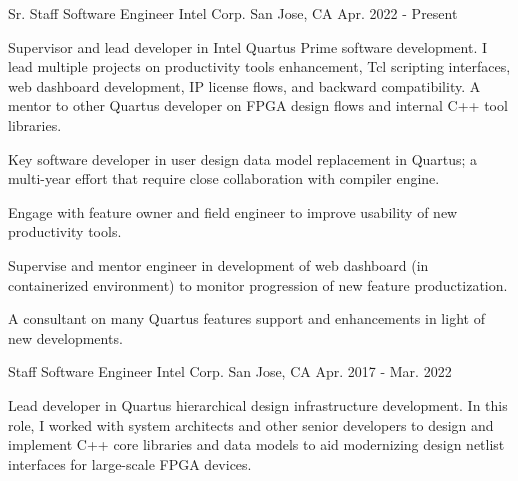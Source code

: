 \documentclass[12pt, letterpaper]{awesome-cv}
\begin{document}

\begin{cventries}
	\cventry
		{Sr. Staff Software Engineer} %
		{Intel Corp.} %
		{San Jose, CA} %
		{Apr. 2022 - Present} %
		{ %
			\begin{cvdescription}
				Supervisor and lead developer in Intel Quartus Prime software development. I lead multiple projects on productivity tools enhancement, Tcl scripting interfaces, web dashboard development, IP license flows, and backward compatibility. A mentor to other Quartus developer on FPGA design flows and internal C++ tool libraries. 
			\end{cvdescription}
			\begin{cvitems}
				\item {Key software developer in user design data model replacement in Quartus; a multi-year effort that require close collaboration with compiler engine.}
				\item {Engage with feature owner and field engineer to improve usability of new productivity tools.}
				\item {Supervise and mentor engineer in development of web dashboard (in containerized environment) to monitor progression of new feature productization.}
				\item {A consultant on many Quartus features support and enhancements in light of new developments.}
			\end{cvitems}
		}
	\cventry
		{Staff Software Engineer} %
		{Intel Corp.} %
		{San Jose, CA} %
		{Apr. 2017 - Mar. 2022} %
		{ %
			\begin{cvdescription}
			Lead developer in Quartus hierarchical design infrastructure development. In this role, I worked with system architects and other senior developers to design and implement C++ core libraries and data models to aid modernizing design netlist interfaces for large-scale FPGA devices.\newline

\end{cvdescription}}
\end{cventries}
\end{document}
